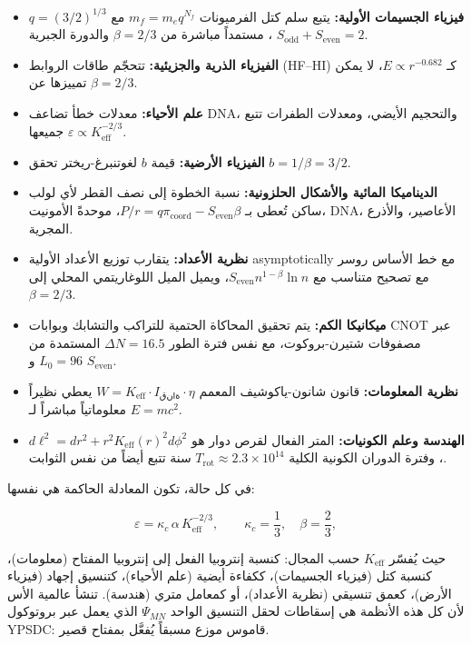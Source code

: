 \documentclass[11pt,a4paper]{article}
\newcommand{\ar}[1]{\foreignlanguage{arabic}{#1}}
\newcommand{\Seven}{S_{\mathrm{even}}}
\begin{document}
	\begin{itemize}
		\item \textbf{\ar{فيزياء الجسيمات الأولية:}} \ar{يتبع سلم كتل الفرميونات \(m_f = m_e q^{N_f}\) مع \(q = (3/2)^{1/3}\)، مستمداً مباشرة من \(\beta = 2/3\) والدورة الجبرية \(S_{\mathrm{odd}}+S_{\mathrm{even}}=2\).}
		\item \textbf{\ar{الفيزياء الذرية والجزيئية:}} \ar{تتحجّم طاقات الروابط (HF–HI) كـ \(E \propto r^{-0.682}\)، لا يمكن تمييزها عن \(\beta = 2/3\).}
		\item \textbf{\ar{علم الأحياء:}} \ar{معدلات خطأ تضاعف DNA، والتحجيم الأيضي، ومعدلات الطفرات تتبع جميعها \(\varepsilon \propto K_{\mathrm{eff}}^{-2/3}\).}
		\item \textbf{\ar{الفيزياء الأرضية:}} \ar{قيمة \(b\) لغوتنبرغ-ريختر تحقق \(b = 1/\beta = 3/2\).}
		\item \textbf{\ar{الديناميكا المائية والأشكال الحلزونية:}} \ar{نسبة الخطوة إلى نصف القطر لأي لولب ساكن تُعطى بـ \(P/r = q \pi_{\mathrm{coord}} - S_{\mathrm{even}}\beta\)، موحدةً الأمونيت، DNA، الأعاصير، والأذرع المجرية.}
		\item \textbf{\ar{نظرية الأعداد:}} \ar{يتقارب توزيع الأعداد الأولية asymptotically مع خط الأساس روسر مع تصحيح متناسب مع \(\Seven n^{1-\beta}\ln n\)، ويميل الميل اللوغاريتمي المحلي إلى \(\beta = 2/3\).}
		\item \textbf{\ar{ميكانيكا الكم:}} \ar{يتم تحقيق المحاكاة الحتمية للتراكب والتشابك وبوابات CNOT عبر مصفوفات شتيرن-بروكوت، مع نفس فترة الطور \(\Delta N = 16.5\) المستمدة من \(L_0=96\) و \(\Seven\).}
		\item \textbf{\ar{نظرية المعلومات:}} \ar{قانون شانون-ياكوشيف المعمم \(W = K_{\mathrm{eff}} \cdot I_{\mathrm{قناة}} \cdot \eta\) يعطي نظيراً معلوماتياً مباشراً لـ \(E = mc^2\).}
		\item \textbf{\ar{الهندسة وعلم الكونيات:}} \ar{المتر الفعال لقرص دوار هو \(d\ell^2 = dr^2 + r^2 K_{\mathrm{eff}}(r)^2 d\phi^2\)، وفترة الدوران الكونية الكلية \(T_{\mathrm{rot}} \approx 2.3\times10^{14}\) سنة تتبع أيضاً من نفس الثوابت.}
	\end{itemize}
	
	\ar{في كل حالة، تكون المعادلة الحاكمة هي نفسها:}
	
	\begin{equation}
		\boxed{ \varepsilon = \kappa_c \, \alpha \, K_{\mathrm{eff}}^{-2/3} },
		\qquad \kappa_c = \frac{1}{3},\quad \beta = \frac{2}{3},
	\end{equation}
	
	\ar{حيث يُفسّر \(K_{\mathrm{eff}}\) حسب المجال: كنسبة إنتروبيا الفعل إلى إنتروبيا المفتاح (معلومات)، كنسبة كتل (فيزياء الجسيمات)، ككفاءة أيضية (علم الأحياء)، كتنسيق إجهاد (فيزياء الأرض)، كعمق تنسيقي (نظرية الأعداد)، أو كمعامل متري (هندسة). تنشأ عالمية الأس لأن كل هذه الأنظمة هي إسقاطات لحقل التنسيق الواحد \(\Psi_{MN}\) الذي يعمل عبر بروتوكول YPSDC: قاموس موزع مسبقاً يُفعَّل بمفتاح قصير.}
	
\end{document}
